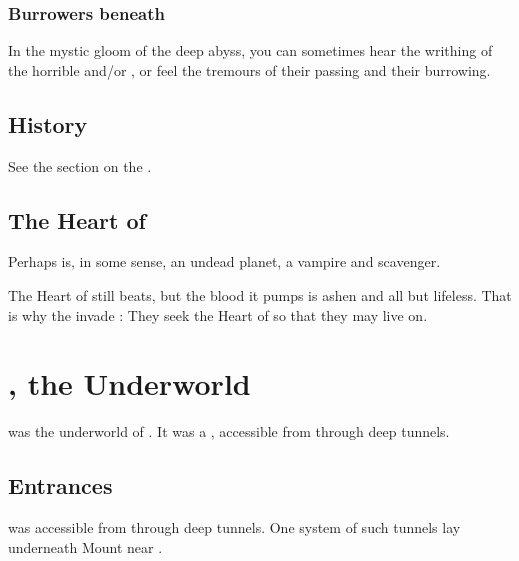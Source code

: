 \subsubsection{Burrowers beneath}
In the mystic gloom of the deep abyss, you can sometimes hear the writhing of the horrible  and/or , or feel the tremours of their passing and their burrowing.









\subsection{History}
See the section on the . 









\subsection{The Heart of \Erebos}
Perhaps \Erebos{} is, in some sense, an undead planet, a vampire and scavenger.

The Heart of \Erebos{} still beats, but the blood it pumps is ashen and all but lifeless. 
That is why the \banes{} invade \Miith{}: 
They seek the Heart of \Miith{} so that they may live on. 















\section{\KaiLeng, the Underworld}
\index{\KaiLeng}
\KaiLeng{} was the underworld of \Miith{}. 
It was a , accessible from \Azmith{} through deep tunnels. 









\subsection{Entrances}
\KaiLeng was accessible from \Azmith{} through deep tunnels. 
One system of such tunnels lay underneath Mount  near . 









